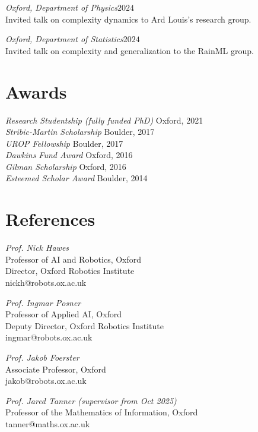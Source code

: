 \documentclass[margin]{res}
\begin{document}
\begin{resume}
                {\sl Oxford, Department of Physics\hfill $2024$}\\
                Invited talk on complexity dynamics to Ard Louis's research group.

                {\sl Oxford, Department of Statistics\hfill $2024$}\\
                Invited talk on complexity and generalization to the RainML group.


                \section{Awards}

                {\sl Research Studentship (fully funded PhD)} \hfill Oxford, 2021 \\
                {\sl Stribic-Martin Scholarship} \hfill Boulder, 2017 \\
                {\sl UROP Fellowship} \hfill Boulder, 2017 \\
                {\sl Dawkins Fund Award} \hfill Oxford, 2016 \\
                {\sl Gilman Scholarship} \hfill Oxford, 2016 \\
                {\sl Esteemed Scholar Award} \hfill Boulder, 2014 \\


                \section{References}
                        {\sl Prof. Nick Hawes}\\
                        Professor of AI and Robotics, Oxford\\
                        Director, Oxford Robotics Institute\\
                        nickh@robots.ox.ac.uk

                        {\sl Prof. Ingmar Posner}\\
                        Professor of Applied AI, Oxford\\
                        Deputy Director, Oxford Robotics Institute\\
                        ingmar@robots.ox.ac.uk

                        {\sl Prof. Jakob Foerster}\\
                        Associate Professor, Oxford\\
                        jakob@robots.ox.ac.uk

                        {\sl Prof. Jared Tanner (supervisor from Oct 2025)}\\
                          Professor of the Mathematics of Information, Oxford\\
                          tanner@maths.ox.ac.uk

\end{resume}
\end{document}
